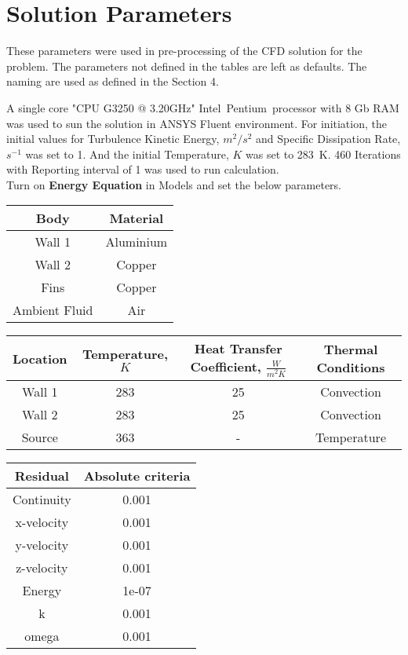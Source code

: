 \documentclass{article}
\begin{document}
\section{Solution Parameters}
\vspace{0.5cm}
These parameters were used in pre-processing of the CFD solution for the problem. The parameters not defined in the tables are left as defaults. The naming are used as defined in the Section 4. 

A single core "CPU G3250 @ 3.20GHz" Intel\textregistered\  Pentium\textregistered\ processor with 8 Gb RAM was used to sun the solution in ANSYS Fluent environment. 
For initiation, the initial values for Turbulence Kinetic Energy, $m^2/s^2$ and Specific Dissipation Rate, $s^{-1}$ was set to 1. And the initial Temperature, $K$ was set to \SI{283}{\kelvin}.
460 Iterations with Reporting interval of 1 was used to run calculation. 
\vspace{0.5cm}\\
Turn on \textbf{Energy Equation} in Models and set the below parameters. 
\vspace{0.5cm}
\begin{center}
\begin{tabular}{c c}
\hline
     Body & Material \\
     \hline
     Wall 1 & Aluminium  \\
     Wall 2 & Copper \\
     Fins & Copper \\
     Ambient Fluid & Air \\
     \hline
\end{tabular} 
\vspace{2cm}
\end{center}
\begin{center}
\begin{tabular}{c c c c}
\hline
     Location & Temperature, $K$ & Heat Transfer Coefficient, $\frac{W}{m^2K}$ & Thermal Conditions\\
     \hline
     Wall 1 & 283 & 25 & Convection\\
     Wall 2 & 283 & 25 & Convection\\
     Source & 363 & - & Temperature\\
     \hline
\end{tabular} 
\end{center}
\vspace{0.5cm}
\begin{center}
\begin{tabular}{c c}
\hline
     Residual & Absolute criteria\\
     \hline
     Continuity & 0.001\\
     x-velocity & 0.001\\
     y-velocity & 0.001\\
     z-velocity & 0.001\\
     Energy & 1e-07\\
     k & 0.001\\
     omega & 0.001\\
     \hline
\end{tabular} 
\end{center}
\end{document}
